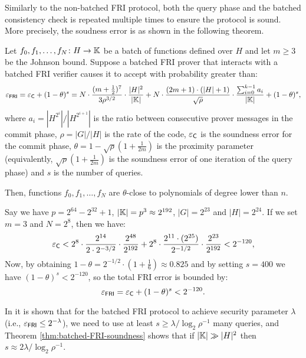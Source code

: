 Similarly to the non-batched FRI protocol, both the query phase and the batched consistency check is repeated multiple times to ensure the protocol is sound. More precisely, the soudness error is as shown in the following theorem.
\begin{theorem}\label{thm:batched-FRI-soundness}
  Let $f_0,f_1,\dots,f_N \colon H \to \mathbb{K}$ be a batch of functions defined over $H$ and let $m \geq 3$ be the Johnson bound. Suppose a batched FRI prover that interacts with a batched FRI verifier causes it to accept with probability greater than:
  \[
    \varepsilon_{\textsf{FRI}} = \varepsilon_{\textsf{C}} + (1-\theta)^s =  N \cdot \frac{(m + \frac{1}{2})^7}{3 \rho^{3/2}} \cdot \frac{|H|^2}{|\mathbb{K}|} + N \cdot \frac{(2m+1) \cdot (|H|+1)}{\sqrt{\rho}} \cdot \frac{\sum_{i=0}^{k-1} a_i}{|\mathbb{K}|} + (1-\theta)^s,
  \] 
  where $a_i = |H^{2^i}|/|H^{2^{i+1}}|$ is the ratio between consecutive prover messages in the commit phase, $\rho = |G| / |H|$ is the rate of the code, $\varepsilon_{\textsf{C}}$ is the soundness error for the commit phase, $\theta = 1 - \sqrt{\rho} (1 + \frac{1}{2m})$ is the proximity parameter (equivalently, $\sqrt{\rho} (1 + \frac{1}{2m})$ is the soundness error of one iteration of the query phase) and $s$ is the number of queries. 

  Then, functions $f_0,f_1,\dots,f_N$ are $\theta$-close to polynomials of degree lower than $n$.
\end{theorem}

\begin{example}
  Say we have $p = 2^{64}-2^{32}+1$, $|\mathbb{K}| = p^3 \approx 2^{192}$, $|G| = 2^{23}$ and $|H| = 2^{24}$. If we set $m = 3$ and $N = 2^8$, then we have:
  \[
    \varepsilon_{\textsf{C}} < 2^8 \cdot \frac{2^{14}}{2 \cdot 2^{-3/2}} \cdot \frac{2^{48}}{2^{192}} + 2^8 \cdot \frac{2^{11} \cdot (2^{25})}{2^{-1/2}} \cdot \frac{2^{23}}{2^{192}} < 2^{-120} ,
  \] 
  Now, by obtaining $1-\theta = 2^{-1/2} \cdot (1 + \frac{1}{6}) \approx  0.825$ and by setting $s=400$ we have $(1-\theta)^{s} < 2^{-120}$, so the total FRI error is bounded by:
  \[
    \varepsilon_{\textsf{FRI}} = \varepsilon_{\textsf{C}} + (1-\theta)^s < 2^{-120}.
  \]
\end{example}
	
In \cite{ICALP:BBHR18} it is shown that for the batched FRI protocol to achieve security parameter $\lambda$ (i.e., $\varepsilon_{\textsf{FRI}} \leq 2^{-\lambda}$), we need to use at least $s \geq \lambda/\log_2{\rho^{-1}}$ many queries, and Theorem \ref{thm:batched-FRI-soundness} shows that if $|\mathbb{K}| \gg |H|^2$ then $s \approx 2\lambda/\log_2{\rho^{-1}}$. 



